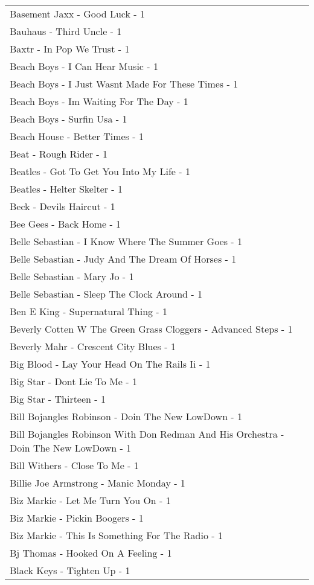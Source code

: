 \documentclass[
]{article}
\begin{document}
\begin{longtable}{l}
Basement Jaxx - Good Luck - 1 \\ 
Bauhaus - Third Uncle - 1 \\ 
Baxtr - In Pop We Trust - 1 \\ 
Beach Boys - I Can Hear Music - 1 \\ 
Beach Boys - I Just Wasnt Made For These Times - 1 \\ 
Beach Boys - Im Waiting For The Day - 1 \\ 
Beach Boys - Surfin Usa - 1 \\ 
Beach House - Better Times - 1 \\ 
Beat - Rough Rider - 1 \\ 
Beatles - Got To Get You Into My Life - 1 \\ 
Beatles - Helter Skelter - 1 \\ 
Beck - Devils Haircut - 1 \\ 
Bee Gees - Back Home - 1 \\ 
Belle Sebastian - I Know Where The Summer Goes - 1 \\ 
Belle Sebastian - Judy And The Dream Of Horses - 1 \\ 
Belle Sebastian - Mary Jo - 1 \\ 
Belle Sebastian - Sleep The Clock Around - 1 \\ 
Ben E King - Supernatural Thing - 1 \\ 
Beverly Cotten W The Green Grass Cloggers - Advanced Steps - 1 \\ 
Beverly Mahr - Crescent City Blues - 1 \\ 
Big Blood - Lay Your Head On The Rails Ii - 1 \\ 
Big Star - Dont Lie To Me - 1 \\ 
Big Star - Thirteen - 1 \\ 
Bill Bojangles Robinson - Doin The New LowDown - 1 \\ 
Bill Bojangles Robinson With Don Redman And His Orchestra - Doin The New LowDown - 1 \\ 
Bill Withers - Close To Me - 1 \\ 
Billie Joe Armstrong - Manic Monday - 1 \\ 
Biz Markie - Let Me Turn You On - 1 \\ 
Biz Markie - Pickin Boogers - 1 \\ 
Biz Markie - This Is Something For The Radio - 1 \\ 
Bj Thomas - Hooked On A Feeling - 1 \\ 
Black Keys - Tighten Up - 1 \\ 

\end{longtable}
\end{document}
